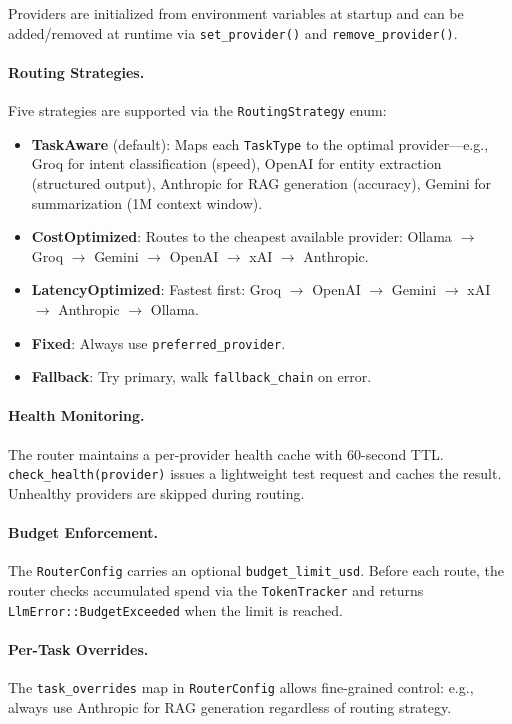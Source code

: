\documentclass[11pt,a4paper,twocolumn]{article}
\begin{document}
Providers are initialized from environment variables at startup and
can be added/removed at runtime via \texttt{set\_provider()} and
\texttt{remove\_provider()}.

\paragraph{Routing Strategies.}
Five strategies are supported via the \texttt{RoutingStrategy} enum:
\begin{itemize}[leftmargin=*]
  \item \textbf{TaskAware} (default): Maps each \texttt{TaskType} to
    the optimal provider---e.g., Groq for intent classification
    (speed), OpenAI for entity extraction (structured output),
    Anthropic for RAG generation (accuracy), Gemini for summarization
    (1M context window).
  \item \textbf{CostOptimized}: Routes to the cheapest available
    provider: Ollama $\to$ Groq $\to$ Gemini $\to$ OpenAI $\to$
    xAI $\to$ Anthropic.
  \item \textbf{LatencyOptimized}: Fastest first: Groq $\to$ OpenAI
    $\to$ Gemini $\to$ xAI $\to$ Anthropic $\to$ Ollama.
  \item \textbf{Fixed}: Always use \texttt{preferred\_provider}.
  \item \textbf{Fallback}: Try primary, walk \texttt{fallback\_chain}
    on error.
\end{itemize}

\paragraph{Health Monitoring.}
The router maintains a per-provider health cache with 60-second TTL.
\texttt{check\_health(provider)} issues a lightweight test request
and caches the result. Unhealthy providers are skipped during routing.

\paragraph{Budget Enforcement.}
The \texttt{RouterConfig} carries an optional \texttt{budget\_limit\_usd}.
Before each route, the router checks accumulated spend via the
\texttt{TokenTracker} and returns \texttt{LlmError::BudgetExceeded}
when the limit is reached.

\paragraph{Per-Task Overrides.}
The \texttt{task\_overrides} map in \texttt{RouterConfig} allows
fine-grained control: e.g., always use Anthropic for RAG generation
regardless of routing strategy.
\end{document}
